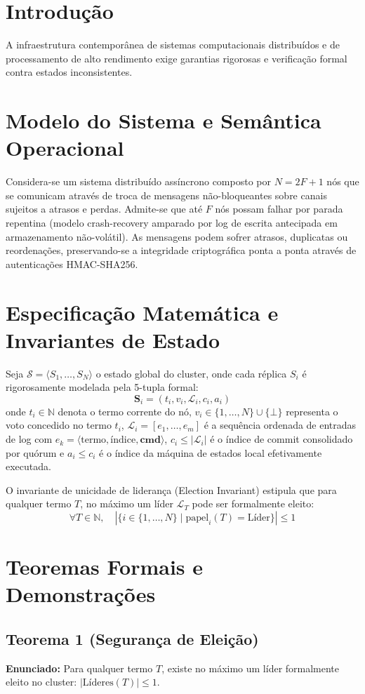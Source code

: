 \documentclass[
  article,
  12pt,
  oneside,
  a4paper,
  english,
  brazil
]{abntex2}
\begin{document}
\section{Introdução}
A infraestrutura contemporânea de sistemas computacionais distribuídos e de processamento de alto rendimento exige garantias rigorosas e verificação formal contra estados inconsistentes.

\section{Modelo do Sistema e Semântica Operacional}
Considera-se um sistema distribuído assíncrono composto por $N = 2F + 1$ nós que se comunicam através de troca de mensagens não-bloqueantes sobre canais sujeitos a atrasos e perdas. Admite-se que até $F$ nós possam falhar por parada repentina (modelo crash-recovery amparado por log de escrita antecipada em armazenamento não-volátil). As mensagens podem sofrer atrasos, duplicatas ou reordenações, preservando-se a integridade criptográfica ponta a ponta através de autenticações HMAC-SHA256.

\section{Especificação Matemática e Invariantes de Estado}
Seja $\mathcal{S} = \langle S_1, \dots, S_N \rangle$ o estado global do cluster, onde cada réplica $S_i$ é rigorosamente modelada pela 5-tupla formal:
$$\mathbf{S}_i = \left( t_i, v_i, \mathcal{L}_i, c_i, a_i \right)$$
onde $t_i \in \mathbb{N}$ denota o termo corrente do nó, $v_i \in \{1, \dots, N\} \cup \{\bot\}$ representa o voto concedido no termo $t_i$, $\mathcal{L}_i = [e_1, \dots, e_m]$ é a sequência ordenada de entradas de log com $e_k = \langle \text{termo}, \text{índice}, \mathbf{cmd} \rangle$, $c_i \le |\mathcal{L}_i|$ é o índice de commit consolidado por quórum e $a_i \le c_i$ é o índice da máquina de estados local efetivamente executada.

O invariante de unicidade de liderança (Election Invariant) estipula que para qualquer termo $T$, no máximo um líder $\mathcal{L}_T$ pode ser formalmente eleito:
$$\forall T \in \mathbb{N}, \quad |\{ i \in \{1, \dots, N\} \mid \text{papel}_i(T) = \text{Líder} \}| \le 1$$

\section{Teoremas Formais e Demonstrações}
\subsection{Teorema 1 (Segurança de Eleição)}
\textbf{Enunciado:} Para qualquer termo $T$, existe no máximo um líder formalmente eleito no cluster: $|\text{Líderes}(T)| \le 1$.
\end{document}
